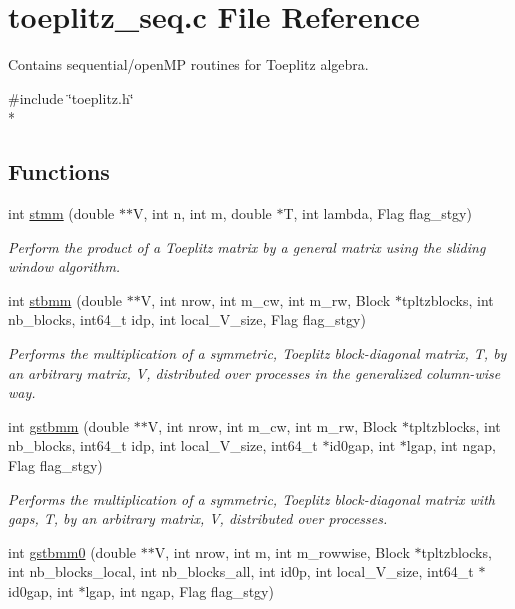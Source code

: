 \section{toeplitz\-\_\-seq.\-c File Reference}
\label{toeplitz__seq_8c}


Contains sequential/open\-M\-P routines for Toeplitz algebra.  


{\ttfamily \#include \char`\"{}toeplitz.\-h\char`\"{}}\\*
\subsection*{Functions}
\begin{DoxyCompactItemize}
\item 
int \hyperlink{toeplitz__seq_8c_ab2face64bf4e429b38b3ae1a6701cc78}{stmm} (double $\ast$$\ast$V, int n, int m, double $\ast$T, int lambda, Flag flag\-\_\-stgy)
\begin{DoxyCompactList}\small\item\em Perform the product of a Toeplitz matrix by a general matrix using the sliding window algorithm. \end{DoxyCompactList}\item 
int \hyperlink{toeplitz__seq_8c_ab51a5dfa887d47b4ce627eb0e01a2e0a}{stbmm} (double $\ast$$\ast$V, int nrow, int m\-\_\-cw, int m\-\_\-rw, Block $\ast$tpltzblocks, int nb\-\_\-blocks, int64\-\_\-t idp, int local\-\_\-\-V\-\_\-size, Flag flag\-\_\-stgy)
\begin{DoxyCompactList}\small\item\em Performs the multiplication of a symmetric, Toeplitz block-\/diagonal matrix, T, by an arbitrary matrix, V, distributed over processes in the generalized column-\/wise way. \end{DoxyCompactList}\item 
int \hyperlink{toeplitz__seq_8c_a4cd10fd194db5a77c0366cddeda596ae}{gstbmm} (double $\ast$$\ast$V, int nrow, int m\-\_\-cw, int m\-\_\-rw, Block $\ast$tpltzblocks, int nb\-\_\-blocks, int64\-\_\-t idp, int local\-\_\-\-V\-\_\-size, int64\-\_\-t $\ast$id0gap, int $\ast$lgap, int ngap, Flag flag\-\_\-stgy)
\begin{DoxyCompactList}\small\item\em Performs the multiplication of a symmetric, Toeplitz block-\/diagonal matrix with gaps, T, by an arbitrary matrix, V, distributed over processes. \end{DoxyCompactList}\item 
int \hyperlink{toeplitz__seq_8c_a5aa00da67c3344b6d0b9d3fdf24d5a1c}{gstbmm0} (double $\ast$$\ast$V, int nrow, int m, int m\-\_\-rowwise, Block $\ast$tpltzblocks, int nb\-\_\-blocks\-\_\-local, int nb\-\_\-blocks\-\_\-all, int id0p, int local\-\_\-\-V\-\_\-size, int64\-\_\-t $\ast$id0gap, int $\ast$lgap, int ngap, Flag flag\-\_\-stgy)
\end{DoxyCompactItemize}


